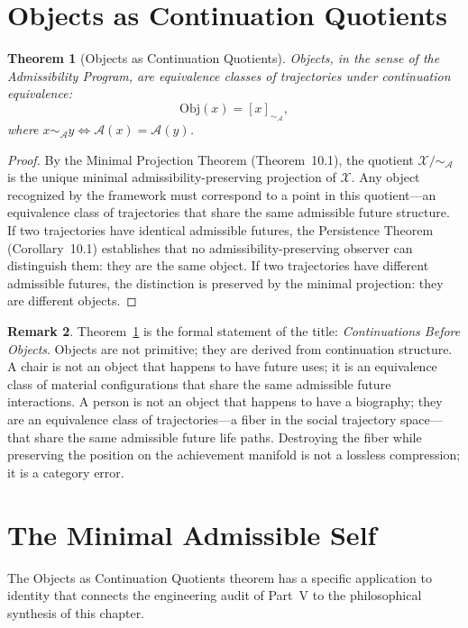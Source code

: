 \documentclass[12pt, oneside]{book}
\theoremstyle{flyxion}
\newtheorem{theorem}{Theorem}[chapter]
\theoremstyle{definition}
\newtheorem{remark}[theorem]{Remark}
\begin{document}
\section{Objects as Continuation Quotients}

\begin{theorem}[Objects as Continuation Quotients]
\label{thm:objects_quotients}
Objects, in the sense of the Admissibility Program,
are equivalence classes of trajectories under
continuation equivalence:
\[
\mathrm{Obj}(x) = [x]_{\sim_\mathcal{A}},
\]
where $x \sim_\mathcal{A} y \iff \mathcal{A}(x) =
\mathcal{A}(y)$.
\end{theorem}

\begin{proof}
By the Minimal Projection Theorem (Theorem~10.1), the
quotient $\mathcal{X}/{\sim_\mathcal{A}}$ is the unique
minimal admissibility-preserving projection of
$\mathcal{X}$. Any object recognized by the framework
must correspond to a point in this quotient---an
equivalence class of trajectories that share the same
admissible future structure. If two trajectories have
identical admissible futures, the Persistence Theorem
(Corollary~10.1) establishes that no
admissibility-preserving observer can distinguish them:
they are the same object. If two trajectories have
different admissible futures, the distinction is
preserved by the minimal projection: they are different
objects.
\end{proof}

\begin{remark}
Theorem~\ref{thm:objects_quotients} is the formal
statement of the title: \emph{Continuations Before
Objects}. Objects are not primitive; they are derived
from continuation structure. A chair is not an object
that happens to have future uses; it is an equivalence
class of material configurations that share the same
admissible future interactions. A person is not an
object that happens to have a biography; they are an
equivalence class of trajectories---a fiber in the
social trajectory space---that share the same
admissible future life paths. Destroying the fiber
while preserving the position on the achievement
manifold is not a lossless compression; it is a
category error.
\end{remark}

\section{The Minimal Admissible Self}

The Objects as Continuation Quotients theorem has a
specific application to identity that connects the
engineering audit of Part~V to the philosophical
synthesis of this chapter.
\end{document}
